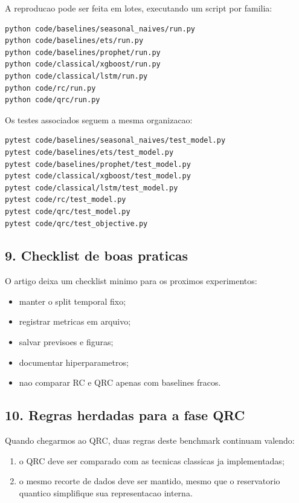 \documentclass[12pt]{article}
\providecommand{\tightlist}{%
          \setlength{\itemsep}{0pt}\setlength{\parskip}{0pt}}
\begin{document}
A reproducao pode ser feita em lotes, executando um script por familia:

\begin{verbatim}
python code/baselines/seasonal_naives/run.py
python code/baselines/ets/run.py
python code/baselines/prophet/run.py
python code/classical/xgboost/run.py
python code/classical/lstm/run.py
python code/rc/run.py
python code/qrc/run.py
\end{verbatim}

Os testes associados seguem a mesma organizacao:

\begin{verbatim}
pytest code/baselines/seasonal_naives/test_model.py
pytest code/baselines/ets/test_model.py
pytest code/baselines/prophet/test_model.py
pytest code/classical/xgboost/test_model.py
pytest code/classical/lstm/test_model.py
pytest code/rc/test_model.py
pytest code/qrc/test_model.py
pytest code/qrc/test_objective.py
\end{verbatim}

\subsection{9. Checklist de boas praticas}\label{9-checklist-de-boas-praticas}

O artigo deixa um checklist minimo para os proximos experimentos:

\begin{itemize}
\tightlist
\item
  manter o split temporal fixo;
\item
  registrar metricas em arquivo;
\item
  salvar previsoes e figuras;
\item
  documentar hiperparametros;
\item
  nao comparar RC e QRC apenas com baselines fracos.
\end{itemize}

\subsection{10. Regras herdadas para a fase QRC}\label{10-regras-herdadas-para-a-fase-qrc}

Quando chegarmos ao QRC, duas regras deste benchmark continuam valendo:

\begin{enumerate}
\def\labelenumi{\arabic{enumi}.}
\tightlist
\item
  o QRC deve ser comparado com as tecnicas classicas ja implementadas;
\item
  o mesmo recorte de dados deve ser mantido, mesmo que o reservatorio quantico simplifique sua representacao interna.
\end{enumerate}
\end{document}
